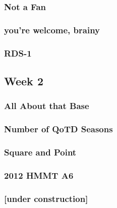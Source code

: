 \documentclass[titlepage=true]{scrartcl}
\begin{document}
    \subsubsection{Not a Fan}
	\label{14.1.5}
	
	\newpage

	\subsubsection{you're welcome, brainy}
	\label{14.1.6}
	
	\newpage

	\subsubsection{RDS-1}
	\label{14.1.7}
	
	\newpage
	
    \subsection{Week 2}
	
	\subsubsection{All About that Base}
	\label{14.2.1}
	
	\newpage

	\subsubsection{Number of QoTD Seasons}
	\label{14.2.2}
	
	\newpage

	\subsubsection{Square and Point}
	\label{14.2.3}
	
	\newpage

	\subsubsection{2012 HMMT A6}
	\label{14.2.4}
	
	\newpage

	\subsubsection{[under construction]}
	\label{14.2.5}
	\newpage
\end{document}
